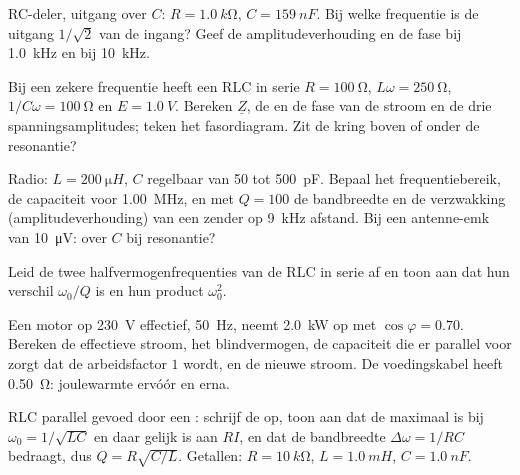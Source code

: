 \begin{exercise}[$\star\star$]\label{exo:b1:sinusoidal-impedance:5}
RC-deler, uitgang over $C$: $R = \qty{1.0}{k\ohm}$, $C = \qty{159}{nF}$.
Bij welke frequentie is de uitgang $1/\sqrt2$ van de ingang? Geef de
amplitudeverhouding en de fase bij \qty{1.0}{kHz} en bij \qty{10}{kHz}.
\end{exercise}

\begin{exercise}[$\star\star$]\label{exo:b1:sinusoidal-impedance:6}
Bij een zekere frequentie heeft een RLC in serie $R = \qty{100}{\ohm}$, $L\omega =
\qty{250}{\ohm}$, $1/C\omega = \qty{100}{\ohm}$ en $E = \qty{1.0}{V}$.
Bereken $\underline Z$, de  en de fase van de stroom en de drie
spanningsamplitudes; teken het fasordiagram. Zit de kring boven of
onder de resonantie?
\end{exercise}

\begin{exercise}[$\star\star$]\label{exo:b1:sinusoidal-impedance:7}
Radio: $L = \qty{200}{\micro H}$, $C$ regelbaar van \qty{50}{} tot
\qty{500}{pF}. Bepaal het frequentiebereik, de capaciteit voor
\qty{1.00}{MHz}, en met $Q = 100$ de bandbreedte en de verzwakking
(amplitudeverhouding) van een zender op \qty{9}{kHz} afstand. Bij een antenne-emk van
\qty{10}{\micro V}:  over $C$ bij resonantie?
\end{exercise}

\begin{exercise}[$\star\star$]\label{exo:b1:sinusoidal-impedance:8}
Leid de twee halfvermogenfrequenties van de RLC in serie af en toon aan dat
hun verschil $\omega_0/Q$ is en hun product $\omega_0^2$.
\end{exercise}

\begin{exercise}[$\star\star$]\label{exo:b1:sinusoidal-impedance:9}
Een motor op \qty{230}{V} effectief, \qty{50}{Hz}, neemt \qty{2.0}{kW} op met
$\cos\varphi = 0.70$. Bereken de effectieve stroom, het blindvermogen, de
capaciteit die er parallel voor zorgt dat de arbeidsfactor $1$ wordt, en de
nieuwe stroom. De voedingskabel heeft \qty{0.50}{\ohm}: joulewarmte ervóór
en erna.
\end{exercise}

\begin{exercise}[$\star\star\star$]\label{exo:b1:sinusoidal-impedance:10}
RLC parallel gevoed door een : schrijf de  op, toon aan dat
de  maximaal is bij $\omega_0 = 1/\sqrt{LC}$ en daar gelijk is aan $RI$,
en dat de bandbreedte $\Delta\omega = 1/RC$ bedraagt, dus $Q =
R\sqrt{C/L}$. Getallen: $R = \qty{10}{k\ohm}$, $L = \qty{1.0}{mH}$,
$C = \qty{1.0}{nF}$.
\end{exercise}


